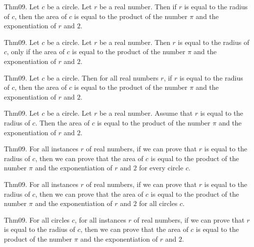 \documentclass{article}
\begin{document}
Thm09. Let $c$ be a circle. Let $r$ be a real number. Then if $r$ is equal to the radius of $c$, then the area of $c$ is equal to the product of the number \(\pi\) and the exponentiation of $r$ and $2$.

Thm09. Let $c$ be a circle. Let $r$ be a real number. Then $r$ is equal to the radius of $c$, only if the area of $c$ is equal to the product of the number \(\pi\) and the exponentiation of $r$ and $2$.

Thm09. Let $c$ be a circle. Then for all real numbers $r$, if $r$ is equal to the radius of $c$, then the area of $c$ is equal to the product of the number \(\pi\) and the exponentiation of $r$ and $2$.

Thm09. Let $c$ be a circle. Let $r$ be a real number. Assume that $r$ is equal to the radius of $c$. Then the area of $c$ is equal to the product of the number \(\pi\) and the exponentiation of $r$ and $2$.

Thm09. For all instances $r$ of real numbers, if we can prove that $r$ is equal to the radius of $c$, then we can prove that the area of $c$ is equal to the product of the number \(\pi\) and the exponentiation of $r$ and $2$ for every circle $c$.

Thm09. For all instances $r$ of real numbers, if we can prove that $r$ is equal to the radius of $c$, then we can prove that the area of $c$ is equal to the product of the number \(\pi\) and the exponentiation of $r$ and $2$ for all circles $c$.

Thm09. For all circles $c$, for all instances $r$ of real numbers, if we can prove that $r$ is equal to the radius of $c$, then we can prove that the area of $c$ is equal to the product of the number \(\pi\) and the exponentiation of $r$ and $2$.
\end{document}
